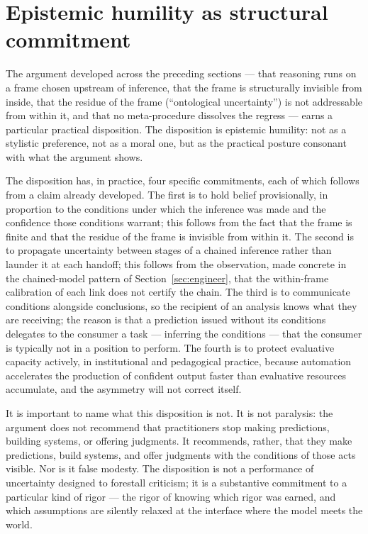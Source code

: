 \documentclass[11pt,a4paper]{article}
\begin{document}
\section{Epistemic humility as structural commitment}
\label{sec:humility}

The argument developed across the preceding sections --- that reasoning
runs on a frame chosen upstream of inference, that the frame is
structurally invisible from inside, that the residue of the frame
(``ontological uncertainty'') is not addressable from within it, and
that no meta-procedure dissolves the regress --- earns a particular
practical disposition. The disposition is epistemic humility: not as a
stylistic preference, not as a moral one, but as the practical posture
consonant with what the argument shows.

The disposition has, in practice, four specific commitments, each of
which follows from a claim already developed. The first is to hold
belief provisionally, in proportion to the conditions under which the
inference was made and the confidence those conditions warrant; this
follows from the fact that the frame is finite and that the residue of
the frame is invisible from within it. The second is to propagate
uncertainty between stages of a chained inference rather than launder it
at each handoff; this follows from the observation, made concrete in the
chained-model pattern of Section~\ref{sec:engineer}, that the
within-frame calibration of each link does not certify the chain. The
third is to communicate conditions alongside conclusions, so the
recipient of an analysis knows what they are receiving; the reason is
that a prediction issued without its conditions delegates to the
consumer a task --- inferring the conditions --- that the consumer is
typically not in a position to perform. The fourth is to protect
evaluative capacity actively, in institutional and pedagogical practice,
because automation accelerates the production of confident output faster
than evaluative resources accumulate, and the asymmetry will not correct
itself.

It is important to name what this disposition is not. It is not
paralysis: the argument does not recommend that practitioners stop
making predictions, building systems, or offering judgments. It
recommends, rather, that they make predictions, build systems, and offer
judgments with the conditions of those acts visible. Nor is it false
modesty. The disposition is not a performance of uncertainty designed to
forestall criticism; it is a substantive commitment to a particular kind
of rigor --- the rigor of knowing which rigor was earned, and which
assumptions are silently relaxed at the interface where the model meets
the world.
\end{document}
